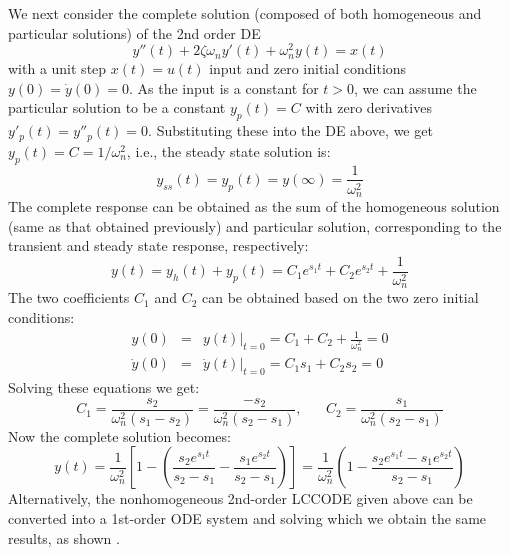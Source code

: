 \documentclass{article}
\begin{document}
We next consider the complete solution (composed of both homogeneous 
and particular solutions) of the 2nd order DE
\begin{equation}
  y''(t)+2\zeta\omega_n y'(t)+\omega_n^2 y(t)=x(t) 
\end{equation}
with a unit step $x(t)=u(t)$ input and zero initial conditions 
$y(0)=\dot{y}(0)=0$. As the input is a constant for $t>0$, we can 
assume the particular solution to be a constant $y_p(t)=C$ with zero 
derivatives $y'_p(t)=y''_p(t)=0$. Substituting these into the DE above, 
we get $y_p(t)=C=1/\omega_n^2$, i.e., the steady state solution is:
\begin{equation}
  y_{ss}(t)=y_p(t)=y(\infty)=\frac{1}{\omega_n^2} 
\end{equation}
The complete response can be obtained as the sum of the homogeneous 
solution (same as that obtained previously) and particular solution, 
corresponding to the transient and steady state response, respectively:
\begin{equation}
  y(t)=y_h(t)+y_p(t)=C_1 e^{s_1t}+C_2 e^{s_2t}+\frac{1}{\omega_n^2} 
\end{equation}
The two coefficients $C_1$ and $C_2$ can be obtained based on the two 
zero initial conditions:
\begin{eqnarray}
  y(0)&=&y(t)\bigg|_{t=0}=C_1+C_2+\frac{1}{\omega_n^2}=0 
  \nonumber \\
  \dot{y}(0)&=&\dot{y}(t)\bigg|_{t=0}=C_1s_1+C_2s_2=0 
\end{eqnarray}
Solving these equations we get:
\begin{equation}
  C_1=\frac{s_2}{\omega_n^2(s_1-s_2)}=\frac{-s_2}{\omega_n^2(s_2-s_1)},
  \;\;\;\;\;\;C_2=\frac{s_1}{\omega_n^2(s_2-s_1)} 
\end{equation}
Now the complete solution becomes:
\begin{equation}
y(t)=\frac{1}{\omega_n^2}\left[1-\left(\frac{s_2e^{s_1t}}{s_2-s_1}
  -\frac{s_1e^{s_2t}}{s_2-s_1}\right)\right] 
=\frac{1}{\omega_n^2}\left(1-\frac{s_2e^{s_1t}-s_1e^{s_2t}}{s_2-s_1}\right)
\end{equation}
Alternatively, the nonhomogeneous 2nd-order LCCODE given above can 
be converted into a 1st-order ODE system and solving which we obtain 
the same results, as shown 
.
\end{document}

